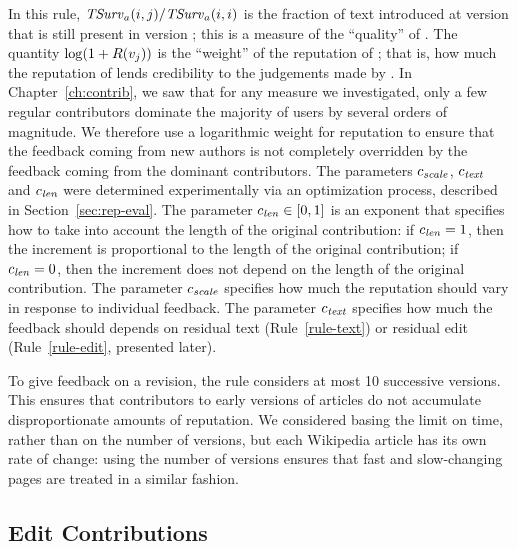 \noindent
In this rule, $\mathit{TSurv}_{a}(i,j) / \mathit{TSurv}_{a}(i,i)$ is the fraction of text
introduced at version  that is still present in version ;
this is a measure of the ``quality'' of .
The quantity $\log(1 + R(v_{j}))$ is the ``weight'' of the
reputation of ;
that is, how much the reputation of  lends
credibility to the judgements made by .
In Chapter~\ref{ch:contrib}, we saw that for any measure we investigated,
only a few regular contributors dominate the majority of users by
several orders of magnitude.
We therefore use a logarithmic weight for reputation
to ensure that the feedback coming from new authors is not completely
overridden by the feedback coming from the dominant contributors.
The parameters ${c_{{\text{\textit{scale}}}}}$, ${c_{{\text{\textit{text}}}}}$ and ${c_{{\text{\textit{len}}}}}$ were
determined experimentally via an optimization process, described
in Section~\ref{sec:rep-eval}.
The parameter ${c_{{\text{\textit{len}}}}} \in [0,1]$ is an exponent that specifies how
to take into account the length of the original contribution: if
${c_{{\text{\textit{len}}}}} = 1$, then the increment is proportional to the length of
the original contribution; if ${c_{{\text{\textit{len}}}}} = 0$, then the increment
does not depend on the length of the original contribution.
The parameter ${c_{{\text{\textit{scale}}}}}$ specifies how much the reputation should
vary in response to individual feedback.
The parameter ${c_{{\text{\textit{text}}}}}$ specifies how much the feedback should
depends on residual text (Rule~\ref{rule-text}) or residual edit
(Rule~\ref{rule-edit}, presented later).

To give feedback on a revision, the rule considers at most 10
successive versions.
This ensures that contributors to early versions of articles do not
accumulate disproportionate amounts of reputation.
We considered basing the limit on time, rather than on the number of
versions, but each Wikipedia article has its own rate of change:
using the number of versions ensures that fast and
slow-changing pages are treated in a similar fashion.

\subsection{Edit Contributions}

